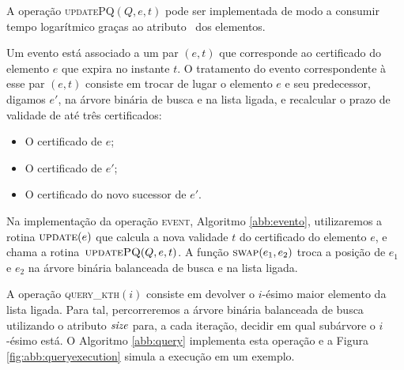 A operação \textsc{updatePQ}$(Q,e,t)$ pode ser implementada de modo
a consumir tempo logarítmico graças ao atributo \pqpos~dos
elementos.

Um evento está associado a um par $(e, t)$ que corresponde ao
certificado do elemento $e$ que expira no instante $t$. O tratamento
do evento correspondente à esse par $(e, t)$ consiste em trocar de
lugar o elemento $e$ e seu predecessor, digamos $e'$, na árvore
binária de busca e na lista ligada, e recalcular o prazo de validade
de até três certificados:

\begin{itemize}
    \item O certificado de $e$;
    \item O certificado de $e'$;
    \item O certificado do novo sucessor de $e'$.
\end{itemize}

Na implementação da operação \textsc{event}, Algoritmo
\ref{abb:evento}, utilizaremos a rotina $\textsc{update}(e)$ que
calcula a nova validade $t$ do certificado do elemento $e$, e chama
a rotina~$\textsc{updatePQ}(Q, e, t)$. A função $\textsc{swap}(e_1,
e_2)$ troca a posição de $e_1$ e $e_2$ na árvore binária balanceada
de busca e na lista ligada.









A operação \textsc{query\_kth}$(i)$ consiste em devolver o $i$-ésimo
maior elemento da lista ligada. Para tal, percorreremos a árvore
binária balanceada de busca utilizando o atributo $\textit{size}$ para,
a cada iteração, decidir em qual subárvore o $i$-ésimo está. O
Algoritmo \ref{abb:query} implementa esta operação e a Figura
\ref{fig:abb:queryexecution} simula a execução em um exemplo.


